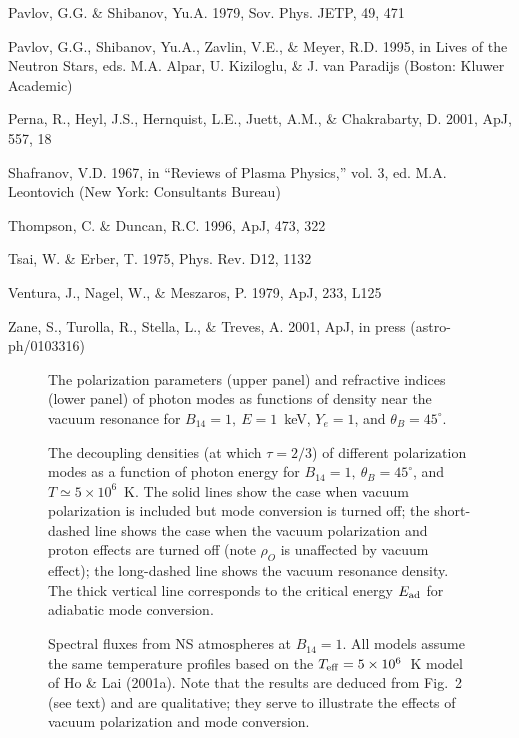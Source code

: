 \documentclass{aastex}
\begin{document}
\begin{thebibliography}{}
Pavlov, G.G. \& Shibanov, Yu.A. 1979, Sov. Phys. JETP, 49, 471

Pavlov, G.G., Shibanov, Yu.A., Zavlin, V.E., \& Meyer, R.D. 1995, in
Lives of the Neutron Stars, eds. M.A. Alpar, U. Kiziloglu, \& J. van Paradijs
(Boston: Kluwer Academic)

Perna, R., Heyl, J.S., Hernquist, L.E., Juett, A.M., \& Chakrabarty, D. 2001,
ApJ, 557, 18

 Shafranov, V.D. 1967, in
 ``Reviews of Plasma Physics,'' vol. 3, ed. M.A. Leontovich (New York:
 Consultants Bureau)

Thompson, C. \& Duncan, R.C. 1996, ApJ, 473, 322

Tsai, W. \& Erber, T. 1975, Phys. Rev. D12, 1132

Ventura, J., Nagel, W., \& Meszaros, P. 1979, ApJ, 233, L125

Zane, S., Turolla, R., Stella, L., \& Treves, A. 2001, ApJ, in press
(astro-ph/0103316)


\end{thebibliography}


\clearpage

\begin{figure}
\caption{The polarization parameters (upper panel) and refractive indices
(lower panel) of photon modes as functions of density near the vacuum
resonance for $B_{14}=1,~E=1$~keV, $Y_e=1$, and $\theta_B=45^\circ$.
\label{fig1}}
\end{figure}

\clearpage
\begin{figure}
\caption{The decoupling densities (at which $\tau=2/3$)
of different polarization modes as a function of photon energy for
$B_{14}=1,~\theta_B=45^\circ$, and $T\simeq 5\times 10^6$~K.
The solid lines show the case when vacuum polarization is included
but mode conversion is turned off; the short-dashed line shows the case
when the vacuum polarization and proton effects are
turned off (note $\rho_O$ is unaffected by vacuum effect);
the long-dashed line shows the vacuum resonance density.
The thick vertical line corresponds to the critical energy $E_{\rm ad}$ for
adiabatic mode conversion.
\label{fig2}}
\end{figure}

\clearpage
\begin{figure}
\caption{Spectral fluxes from NS atmospheres at $B_{14}=1$.
All models assume the same temperature profiles based on  
the $T_{\rm eff}=5\times 10^6$~K model of Ho \& Lai (2001a).
Note that the results are deduced from Fig.~2 (see text) and are
qualitative; they serve to illustrate the effects of 
vacuum polarization and mode conversion. 
\label{fig3}}
\end{figure}
\end{document}
